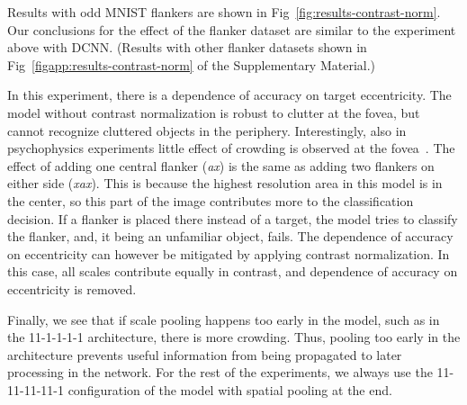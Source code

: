 \documentclass{article}
\begin{document}
Results with odd MNIST flankers are shown in Fig~\ref{fig:results-contrast-norm}.  Our conclusions for the effect of the flanker dataset are similar to the experiment above with DCNN.  (Results with other flanker datasets shown in Fig~\ref{figapp:results-contrast-norm} of the Supplementary Material.)

In this experiment, there is a dependence of accuracy on target eccentricity.  The model without contrast normalization is robust to clutter at the fovea, but cannot recognize cluttered objects in the periphery.  Interestingly, also in psychophysics experiments little effect of crowding is observed at the fovea~\cite{levi2008crowding}. The effect of adding one central flanker (\emph{ax}) is the same as adding two flankers on either side (\emph{xax}). This is because the highest resolution area in this model is in the center, so this part of the image contributes more to the classification decision. If a flanker is placed there instead of a target, the model tries to classify the flanker, and, it being an unfamiliar object, fails.
The dependence of accuracy on eccentricity can however be mitigated by applying contrast normalization.  In this case, all scales contribute equally in contrast, and dependence of accuracy on eccentricity is removed.

Finally, we see that if scale pooling happens too early in the model, such as in the 11-1-1-1-1 architecture, there is more crowding.  Thus, pooling too early in the architecture prevents useful information from being propagated to later processing in the network.  For the rest of the experiments, we always use the 11-11-11-11-1 configuration of the model with spatial pooling at the end.
\end{document}

